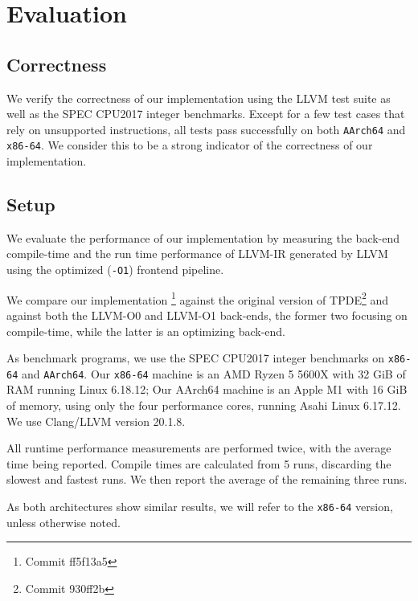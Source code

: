 \specruntimespeedup

\chapter{Evaluation}\label{chapter:evaluation}
\section{Correctness}
We verify the correctness of our implementation using the LLVM test suite as well as the SPEC CPU2017 integer benchmarks. Except for a few test cases that rely on unsupported instructions, all tests pass successfully on both \texttt{AArch64} and \texttt{x86-64}. We consider this to be a strong indicator of the correctness of our implementation.

\section{Setup}
We evaluate the performance of our implementation by measuring the back-end
compile-time and the run time performance of LLVM-IR generated by LLVM using the optimized (\texttt{-O1}) frontend pipeline.

We compare our implementation \footnote{Commit ff5f13a5} against
 the original version of TPDE\footnote{Commit 930ff2b} and against both the LLVM-O0 and LLVM-O1 back-ends, the former two focusing on compile-time, while the latter is an optimizing back-end. 

As benchmark programs, we use the SPEC CPU2017 integer benchmarks on \texttt{x86-64} and \texttt{AArch64}.
Our \texttt{x86-64} machine is an AMD Ryzen 5 5600X with 32 GiB of RAM running Linux 6.18.12; Our
AArch64 machine is an Apple M1 with 16 GiB of memory, using only the four performance cores,
running Asahi Linux 6.17.12. We use Clang/LLVM version 20.1.8.

All runtime performance measurements are performed twice, with the average time being reported. Compile times are calculated from 5 runs, discarding the slowest and fastest runs. We then report the average of the remaining three runs.

As both architectures show similar results, we will refer to the \texttt{x86-64} version, unless otherwise noted.

